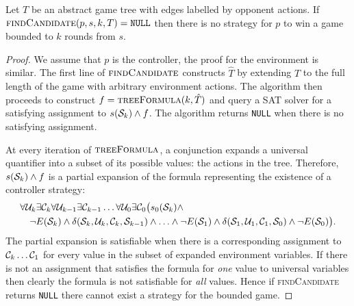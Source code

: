 \begin{proposition}\label{prop:findcandidate}
    Let $T$ be an abstract game tree with edges labelled by opponent actions. If $\textsc{findCandidate}(p, s, k, T) = \texttt{NULL}$ then there is no strategy for $p$ to win a game bounded to $k$ rounds from $s$.
\end{proposition}
\begin{proof}
    We assume that $p$ is the controller, the proof for the environment is similar. The first line of $\textsc{findCandidate}$ constructs $\hat{T}$ by extending $T$ to the full length of the game with arbitrary environment actions. The algorithm then proceeds to construct $f = \textsc{treeFormula}(k, \hat{T})$ and query a SAT solver for a satisfying assignment to $s(\mathcal{S}_k) \land f$. The algorithm returns \texttt{NULL} when there is no satisfying assignment.


    At every iteration of $\textsc{treeFormula}$, a conjunction expands a universal quantifier into a subset of its possible values: the actions in the tree. Therefore, $s(\mathcal{S}_k) \land f$ is a partial expansion of the formula representing the existence of a controller strategy:
    \begin{equation*}
    \begin{multlined}
    \forall \cU_k \exists \cC_k \forall \cU_{k-1} \exists \cC_{k-1} \ldots \forall \cU_0 \exists \cC_0 \big( s_0(\cS_k) \land \\
    \lnot E(\cS_k) \land \delta(\cS_k, \cU_k, \cC_k, \cS_{k-1}) \land \ldots \land \lnot E(\cS_1) \land \delta(\cS_1, \cU_1, \cC_1, \cS_0) \land \lnot E(\cS_0) \big).
    \end{multlined}
    \end{equation*}
    The partial expansion is satisfiable when there is a corresponding assignment to $\mathcal{C}_k \dots \mathcal{C}_1$ for every value in the subset of expanded environment variables.  If there is not an assignment that satisfies the formula for \emph{one} value to universal variables then clearly the formula is not satisfiable for \emph{all} values.  Hence if \textsc{findCandidate} returns \texttt{NULL} there cannot exist a strategy for the bounded game.
\end{proof}

